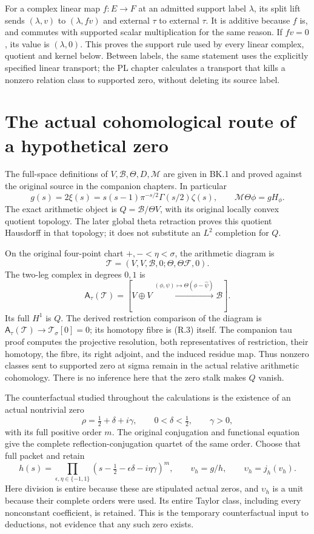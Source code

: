 For a complex linear map $f:E\to F$ at an admitted support label
$\lambda$, its split lift sends $(\lambda,v)$ to $(\lambda,fv)$ and
external $\tau$ to external $\tau$. It is additive because $f$ is,
and commutes with supported scalar multiplication for the same reason.
If $fv=0$, its value is $(\lambda,0)$. This proves the support rule used
by every linear complex, quotient and kernel below. Between labels, the
same statement uses the explicitly specified linear transport; the PL
chapter calculates a transport that kills a nonzero relation class to
supported zero, without deleting its source label.

\section{The actual cohomological route of a hypothetical zero}

The full-space definitions of $V,\mathscr B,\Theta,D,\mathcal M$ are
given in BK.1 and proved against the original source in the companion
chapters. In particular
\[
g(s)=2\xi(s)=s(s-1)\pi^{-s/2}\Gamma(s/2)\zeta(s),\qquad
\mathcal M\Theta\phi=gH_\phi.
\]
The exact arithmetic object is $Q=\mathscr B/\Theta V$, with its
original locally convex quotient topology. The later global theta
retraction proves this quotient Hausdorff in that topology; it does not
substitute an $L^2$ completion for $Q$.

On the original four-point chart $+,-<\eta<\sigma$, the arithmetic
diagram is
\[
\mathcal T=(V,V,\mathscr B,0;\Theta,\Theta\mathcal F,0).
\]
The two-leg complex in degrees $0,1$ is
\[
\mathsf A_\tau(\mathcal T)=
[V\oplus V\xrightarrow{(\phi,\psi)\mapsto
\Theta(\phi-\widehat\psi)}\mathscr B].                 \tag{R.3}
\]
Its full $H^1$ is $Q$. The derived restriction comparison of the
diagram is $\mathsf A_\tau(\mathcal T)\to\mathcal T_\sigma[0]=0$;
its homotopy fibre is (R.3) itself. The companion tau proof
computes the projective resolution, both representatives of restriction,
their homotopy, the fibre, its right adjoint, and the induced residue
map. Thus nonzero classes sent to supported zero at sigma remain in the
actual relative arithmetic cohomology. There is no inference here that
the zero stalk makes $Q$ vanish.

The counterfactual studied throughout the calculations is the existence
of an actual nontrivial zero
\[
\rho=\tfrac12+\delta+i\gamma,\qquad
0<\delta<\tfrac12,\qquad\gamma>0,
\]
with its full positive order $m$. The original conjugation and functional
equation give the complete reflection-conjugation quartet of the same
order. Choose that full packet and retain
\[
h(s)=\prod_{\epsilon,\eta\in\{-1,1\}}
(s-\tfrac12-\epsilon\delta-i\eta\gamma)^m,\qquad
v_h=g/h,\qquad \upsilon_h=j_h(v_h).                     \tag{R.4}
\]
Here division is entire because these are stipulated actual zeros, and
$\upsilon_h$ is a unit because their complete orders were used. Its
entire Taylor class, including every nonconstant coefficient, is retained.
This is the temporary counterfactual input to deductions, not evidence
that any such zero exists.

